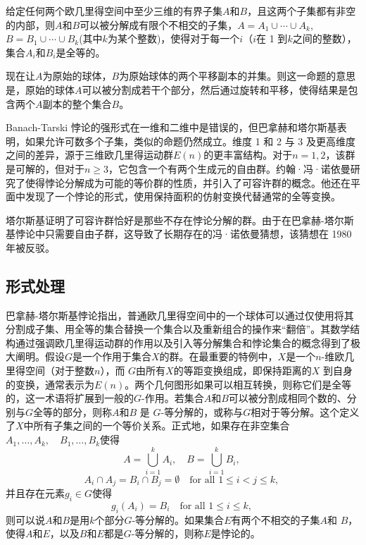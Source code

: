 给定任何两个欧几里得空间中至少三维的有界子集\( A \)和\( B \)，且这两个子集都有非空的内部，则\( A \)和\( B \)可以被分解成有限个不相交的子集，\(A = A_1 \cup \cdots \cup A_k\),\(B = B_1 \cup \cdots \cup B_k \)(其中\(k\)为某个整数)，使得对于每一个\( i \)（\( i \)在 1 到\( k \)之间的整数），集合\( A_i \)和\( B_i \)是全等的。  

现在让\( A \)为原始的球体，\( B \)为原始球体的两个平移副本的并集。则这一命题的意思是，原始的球体\( A \)可以被分割成若干个部分，然后通过旋转和平移，使得结果是包含两个\( A \)副本的整个集合\( B \)。

Banach-Tarski 悖论的强形式在一维和二维中是错误的，但巴拿赫和塔尔斯基表明，如果允许可数多个子集，类似的命题仍然成立。维度 1 和 2 与 3 及更高维度之间的差异，源于三维欧几里得运动群\( E(n) \)的更丰富结构。对于\( n = 1, 2 \)，该群是可解的，但对于\( n \geq 3 \)，它包含一个有两个生成元的自由群。约翰·冯·诺依曼研究了使得悖论分解成为可能的等价群的性质，并引入了可容许群的概念。他还在平面中发现了一个悖论的形式，使用保持面积的仿射变换代替通常的全等变换。

塔尔斯基证明了可容许群恰好是那些不存在悖论分解的群。由于在巴拿赫-塔尔斯基悖论中只需要自由子群，这导致了长期存在的冯·诺依曼猜想，该猜想在 1980 年被反驳。
\subsection{形式处理}  
巴拿赫-塔尔斯基悖论指出，普通欧几里得空间中的一个球体可以通过仅使用将其分割成子集、用全等的集合替换一个集合以及重新组合的操作来“翻倍”。其数学结构通过强调欧几里得运动群的作用以及引入等分解集合和悖论集合的概念得到了极大阐明。假设\( G \)是一个作用于集合\( X \)的群。在最重要的特例中，\( X \)是一个\( n \)-维欧几里得空间（对于整数\( n \)），而 \( G \)由所有\( X \)的等距变换组成，即保持距离的\( X \) 到自身的变换，通常表示为\( E(n) \)。两个几何图形如果可以相互转换，则称它们是全等的，这一术语将扩展到一般的\( G \)-作用。若集合\( A \)和\( B \)可以被分割成相同个数的、分别与\( G \)全等的部分，则称\( A \)和\( B \) 是 \( G \)-等分解的，或称与\( G \)相对于等分解。这个定义了\( X \)中所有子集之间的一个等价关系。正式地，如果存在非空集合\(A_1, \dots, A_k, \quad B_1, \dots, B_k\)使得
\[
A = \bigcup _{i=1}^{k}A_{i}, \quad B = \bigcup _{i=1}^{k}B_{i},~
\]
\[
A_i \cap A_j = B_i \cap B_j = \emptyset \quad \text{for all } 1 \leq i < j \leq k,~
\]
并且存在元素\( g_i \in G \)使得
\[
g_i(A_i) = B_i \quad \text{for all } 1 \leq i \leq k,~
\]
则可以说\( A \)和\( B \)是用\( k \)个部分\( G \)-等分解的。如果集合\( E \)有两个不相交的子集\( A \)和 \( B \)，使得\( A \)和\( E \)，以及\( B \)和\( E \)都是\( G \)-等分解的，则称\( E \)是悖论的。

